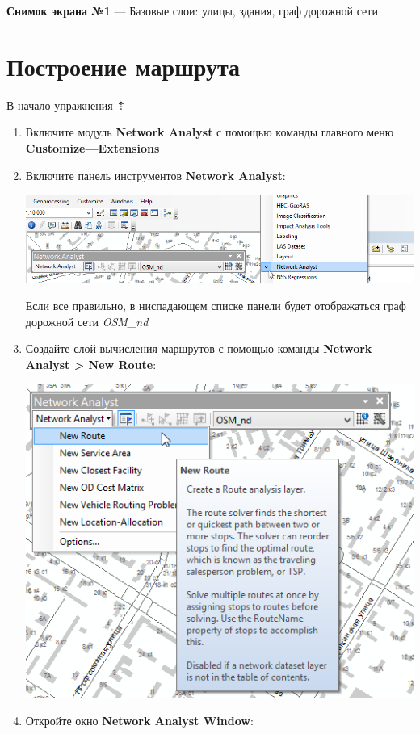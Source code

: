 \documentclass[12pt,]{book}
\begin{document}
\textbf{Снимок экрана №1} --- Базовые слои: улицы, здания, граф дорожной сети

\hypertarget{network-analysis-route}{%
\section{Построение маршрута}\label{network-analysis-route}}

\protect\hyperlink{network-analysis}{В начало упражнения ⇡}

\begin{enumerate}
\def\labelenumi{\arabic{enumi}.}
\item
  Включите модуль \textbf{Network Analyst} с помощью команды главного меню
  \textbf{Customize---Extensions}
\item
  Включите панель инструментов \textbf{Network Analyst}:

  \includegraphics{images/Ex12/image7.png}

  Если все правильно, в ниспадающем списке панели будет отображаться граф дорожной сети \emph{OSM\_nd}
\item
  Создайте слой вычисления маршрутов с помощью команды \textbf{Network Analyst \textgreater{} New Route}:

  \includegraphics{images/Ex12/image8.png}
\item
  Откройте окно \textbf{Network Analyst Window}:


\end{enumerate}
\end{document}
